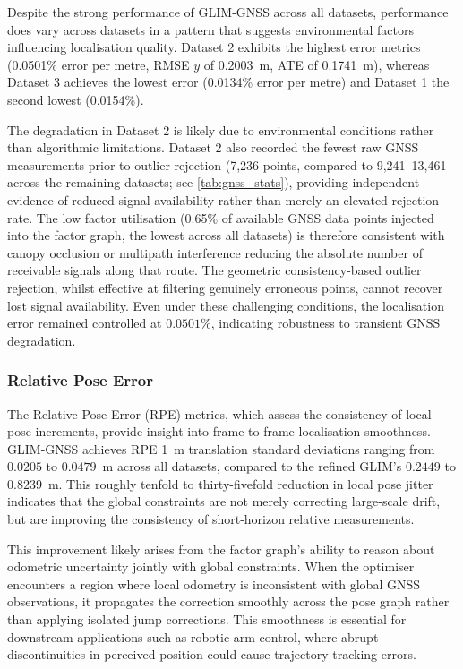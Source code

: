 Despite the strong performance of GLIM-GNSS across all datasets, performance does vary across datasets in a pattern that suggests environmental factors influencing localisation quality. Dataset 2 exhibits the highest error metrics (0.0501\% error per metre, RMSE $y$ of 0.2003~m, ATE of 0.1741~m), whereas Dataset 3 achieves the lowest error (0.0134\% error per metre) and Dataset 1 the second lowest (0.0154\%). 

The degradation in Dataset 2 is likely due to environmental conditions rather than algorithmic limitations. Dataset 2 also recorded the fewest raw GNSS measurements prior to outlier rejection (7,236 points, compared to 9,241--13,461 across the remaining datasets; see \cref{tab:gnss_stats}), providing independent evidence of reduced signal availability rather than merely an elevated rejection rate. The low factor utilisation (0.65\% of available GNSS data points injected into the factor graph, the lowest across all datasets) is therefore consistent with canopy occlusion or multipath interference reducing the absolute number of receivable signals along that route. The geometric consistency-based outlier rejection, whilst effective at filtering genuinely erroneous points, cannot recover lost signal availability. Even under these challenging conditions, the localisation error remained controlled at $0.0501\%$, indicating robustness to transient GNSS degradation.

\subsubsection{Relative Pose Error}

The Relative Pose Error (RPE) metrics, which assess the consistency of local pose increments, provide insight into frame-to-frame localisation smoothness. GLIM-GNSS achieves RPE 1~m translation standard deviations ranging from $0.0205$ to $0.0479$~m across all datasets, compared to the refined GLIM's $0.2449$ to $0.8239$~m. This roughly tenfold to thirty-fivefold reduction in local pose jitter indicates that the global constraints are not merely correcting large-scale drift, but are improving the consistency of short-horizon relative measurements.

This improvement likely arises from the factor graph's ability to reason about odometric uncertainty jointly with global constraints. When the optimiser encounters a region where local odometry is inconsistent with global GNSS observations, it propagates the correction smoothly across the pose graph rather than applying isolated jump corrections. This smoothness is essential for downstream applications such as robotic arm control, where abrupt discontinuities in perceived position could cause trajectory tracking errors.

